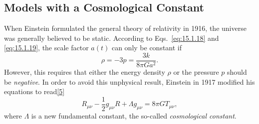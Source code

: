 
\subsection{Models with a Cosmological Constant}\label{sec:16.2}

When Einstein formulated the general theory of relativity in 1916, the universe
was generally believed to be static. According to Eqs.~\eqref{eq:15.1.18} and
\eqref{eq:15.1.19}, the scale factor \(a(t)\) can only be constant if
\[
  \rho=-3p=\frac{3k}{8\pi G a^2}.
\]
However, this requires that either the energy density \(\rho\) or the pressure
\(p\) should be \emph{negative}. In order to avoid this unphysical result,
Einstein in 1917 modified his equations to
read\hyperref[ch16-ref-5]{[5]}
\begin{equation}
  R_{\mu\nu}
  -\frac12g_{\mu\nu}R
  +\Lambda g_{\mu\nu}
  =
  8\pi G T_{\mu\nu},
  \tag{16.2.1}\label{eq:16.2.1}
\end{equation}
where \(\Lambda\) is a new fundamental constant, the so-called
\emph{cosmological constant}.

